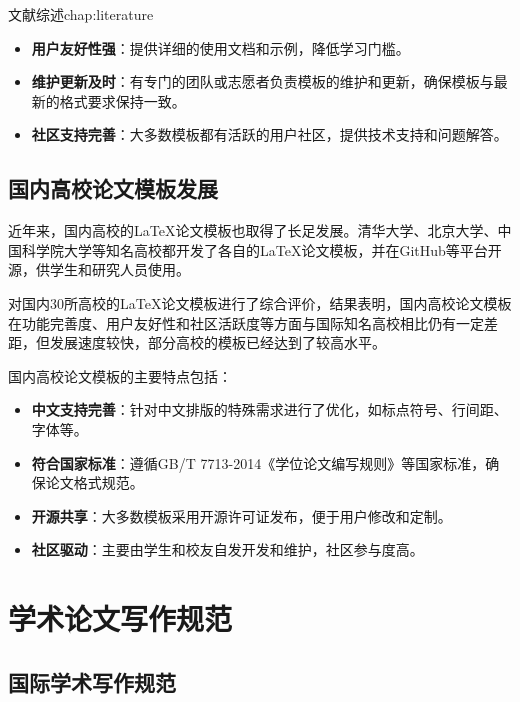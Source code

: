 \begin{cuzchapter}{文献综述}{chap:literature}
\begin{itemize}
		\item \textbf{用户友好性强}：提供详细的使用文档和示例，降低学习门槛。
		
		\item \textbf{维护更新及时}：有专门的团队或志愿者负责模板的维护和更新，确保模板与最新的格式要求保持一致。
		
		\item \textbf{社区支持完善}：大多数模板都有活跃的用户社区，提供技术支持和问题解答。
	\end{itemize}
	
	\subsection{国内高校论文模板发展}
	
	近年来，国内高校的\LaTeX{}论文模板也取得了长足发展。清华大学、北京大学、中国科学院大学等知名高校都开发了各自的\LaTeX{}论文模板，并在GitHub等平台开源，供学生和研究人员使用。
	
	\citet{niu2013zonghe}对国内30所高校的\LaTeX{}论文模板进行了综合评价，结果表明，国内高校论文模板在功能完善度、用户友好性和社区活跃度等方面与国际知名高校相比仍有一定差距，但发展速度较快，部分高校的模板已经达到了较高水平。
	
	国内高校论文模板的主要特点包括：
	
	\begin{itemize}
		\item \textbf{中文支持完善}：针对中文排版的特殊需求进行了优化，如标点符号、行间距、字体等。
		
		\item \textbf{符合国家标准}：遵循GB/T 7713-2014《学位论文编写规则》等国家标准，确保论文格式规范。
		
		\item \textbf{开源共享}：大多数模板采用开源许可证发布，便于用户修改和定制。
		
		\item \textbf{社区驱动}：主要由学生和校友自发开发和维护，社区参与度高。
	\end{itemize}
	
	\section{学术论文写作规范}\label{sec:writing-standards}
	
	\subsection{国际学术写作规范}
	

\end{cuzchapter}
